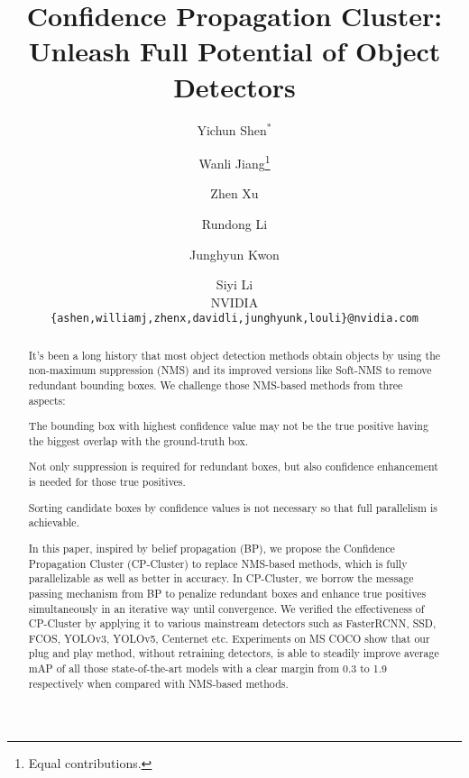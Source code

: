 \documentclass[10pt,twocolumn,letterpaper]{article}
\begin{document}
\title{Confidence Propagation Cluster: Unleash Full Potential of Object Detectors}

\author{Yichun Shen$^*$ \and Wanli Jiang\thanks{Equal contributions.} \and Zhen Xu \and Rundong Li \and Junghyun Kwon \and Siyi Li\\
NVIDIA\\
{\tt\small \{ashen,williamj,zhenx,davidli,junghyunk,louli\}@nvidia.com}
}
\maketitle
\begin{abstract}
  It's been a long history that most object detection methods obtain objects by using the non-maximum suppression (NMS) and its improved versions like Soft-NMS to remove redundant bounding boxes.
  We challenge those NMS-based methods from three aspects:
  \begin{enumerate*}[1)]
    \item The bounding box with highest confidence value may not be the true positive having the biggest overlap with the ground-truth box.
    \item Not only suppression is required for redundant boxes, but also confidence enhancement is needed for those true positives.
    \item Sorting candidate boxes by confidence values is not necessary so that full parallelism is achievable.
  \end{enumerate*}

  In this paper, inspired by belief propagation (BP), we propose the Confidence Propagation Cluster (CP-Cluster) to replace NMS-based methods, which is fully parallelizable as well as better in accuracy.
  In CP-Cluster, we borrow the message passing mechanism from BP to penalize redundant boxes and enhance true positives simultaneously in an iterative way until convergence.
  We verified the effectiveness of CP-Cluster by applying it to various mainstream detectors such as FasterRCNN, SSD, FCOS, YOLOv3, YOLOv5, Centernet etc.
  Experiments on MS COCO show that our plug and play method, without retraining detectors, is able to steadily improve average mAP of all those state-of-the-art models with a clear margin from 0.3 to 1.9 respectively when compared with NMS-based methods.
\end{abstract}
\end{document}
